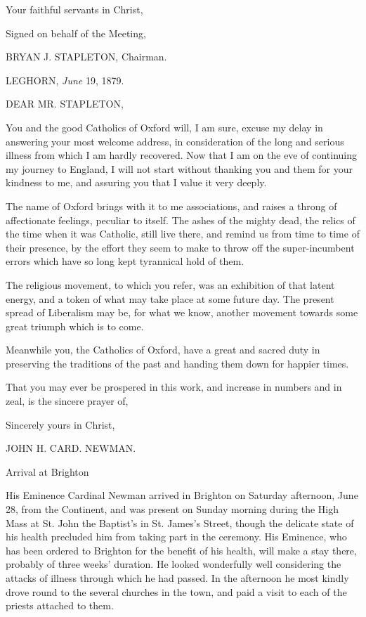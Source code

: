 Your faithful servants in Christ,

Signed on behalf of the Meeting,

BRYAN J. STAPLETON,
Chairman.


LEGHORN, \emph{June} 19, 1879.

DEAR MR. STAPLETON,

You and the good Catholics of Oxford will, I am sure, excuse my delay
in answering your most welcome address, in consideration of the long
and serious illness from which I am hardly recovered. Now that I am on
the eve of continuing my journey to England, I will not start without
thanking you and them for your kindness to me, and assuring you that I
value it very deeply.

The name of Oxford brings with it to me associations, and raises a
throng of affectionate feelings, peculiar to itself. The ashes of the
mighty dead, the relics of the time when it was Catholic, still
live there, and remind us from time to time of their presence, by the
effort they seem to make to throw off the super-incumbent errors which
have so long kept tyrannical hold of them.

The religious movement, to which you refer, was an exhibition of
that latent energy, and a token of what may take place at some future
day. The present spread of Liberalism may be, for what we know,
another movement towards some great triumph which is to come.

Meanwhile you, the Catholics of Oxford, have a great and sacred
duty in preserving the traditions of the past and handing them down
for happier times.

That you may ever be prospered in this work, and increase in
numbers and in zeal, is the sincere prayer of,

Sincerely yours in Christ,

JOHN H. CARD. NEWMAN.


Arrival at Brighton

His Eminence Cardinal Newman arrived in Brighton on Saturday
afternoon, June 28, from the Continent, and was present on Sunday
morning during the High Mass at St. John
the Baptist's in St. James's Street, though the delicate state of his
health precluded him from taking part in the ceremony. His Eminence,
who has been ordered to Brighton for the benefit of his health, will
make a stay there, probably of three weeks' duration. He looked
wonderfully well considering the attacks of illness through which he
had passed. In the afternoon he most kindly drove round to the several
churches in the town, and paid a visit to each of the priests attached
to them.

